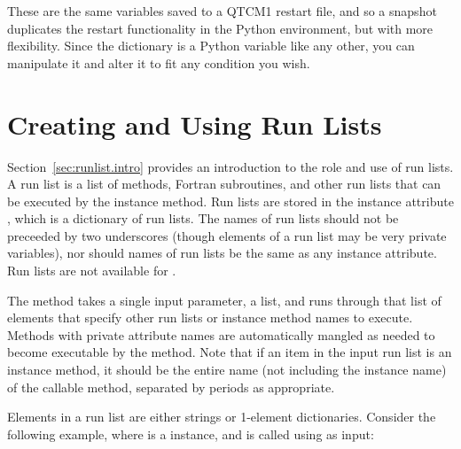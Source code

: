 \begin{center}

\end{center}

These are the same variables saved to a QTCM1 restart file, and so
a snapshot duplicates the restart functionality in the Python
environment, but with more flexibility.  Since the 
dictionary is a Python variable like any other, you can manipulate
it and alter it to fit any condition you wish.




\section{Creating and Using Run Lists}  \label{sec:runlists}

Section~\ref{sec:runlist.intro} provides an introduction to the
role and use of run lists.  A run list is a list of methods, Fortran
subroutines, and other run lists that can be executed by the
 instance  method.  Run lists are stored
in the  instance attribute , which is a
dictionary of run lists.  The names of run lists should not be
preceeded by two underscores (though elements of a run list may be
very private variables), nor should names of run lists be the same
as any instance attribute.  Run lists are not available for
.

The  method takes a single input parameter, a list,
and runs through that list of elements that specify other run lists
or instance method names to execute.  Methods with private attribute
names are automatically mangled as needed to become executable by
the method.  Note that if an item in the input run list is an
instance method, it should be the entire name (not including the
instance name) of the callable method, separated by periods as
appropriate.

Elements in a run list are either strings or 1-element dictionaries.
Consider the following example, where  is a 
instance, and  is called using  as
input:

\begin{codeblock}
\end{codeblock}

